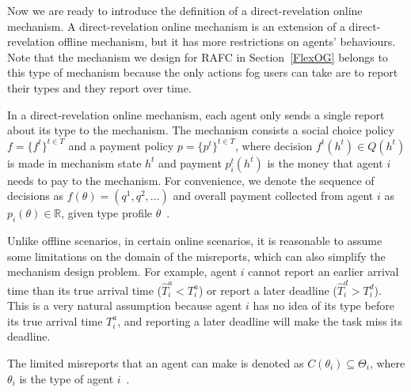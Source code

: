 \documentclass[11pt]{phdthesis}
\begin{document}
Now we are ready to introduce the definition of a direct-revelation online mechanism. A direct-revelation online mechanism is an extension of a direct-revelation offline mechanism, but it has more restrictions on agents' behaviours. Note that the mechanism we design for RAFC in Section~\ref{FlexOG} belongs to this type of mechanism because the only actions fog users can take are to report their types and they report over time. 

\begin{definition}
	In a direct-revelation online mechanism, each agent only sends a single report about its type to the mechanism. The mechanism consists a social choice policy $f =\{f^t\}^{t\in T}$ and a payment policy $p = \{p^t\}^{t\in T}$, where decision $ f^t(h^t) \in Q(h^t) $ is made in mechanism state $ h^t $ and payment $ p_i^t(h^t) $ is the money that agent $ i $ needs to pay to the mechanism. For convenience, we denote the sequence of decisions as $f(\theta) = (q^1,q^2,\ldots)$ and overall payment collected from agent $i$ as $p_i(\theta) \in \mathbb{R}$, given type profile $ \theta $~\citep[Definition 16.2]{nisan2007algorithmic}.
\end{definition}

Unlike offline scenarios, in certain online scenarios, it is reasonable to assume some limitations on the domain of the misreports, which can also simplify the mechanism design problem. For example, agent $ i $ cannot report an earlier arrival time than its true arrival time ($ \hat{T}_i^a < T_i^a $) or report a later deadline ($ \hat{T}_i^d > T_i^d$). This is a very natural assumption because agent $ i $ has no idea of its type before its true arrival time $ T_i^a $, and reporting a later deadline will make the task miss its deadline. 

\begin{definition}
	The limited misreports that an agent can make is denoted as $C(\theta_i) \subseteq \Theta_i$, where $\theta_i$ is the type of agent $i$~\citep[Definition 16.4]{nisan2007algorithmic}.
\end{definition}

%
\end{document}
